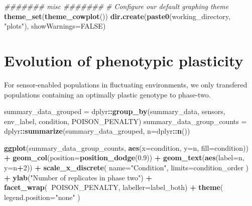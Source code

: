\documentclass[]{book}
\newenvironment{Shaded}{\begin{snugshade}}{\end{snugshade}}
\newcommand{\CommentTok}[1]{\textcolor[rgb]{0.56,0.35,0.01}{\textit{#1}}}
\newcommand{\DataTypeTok}[1]{\textcolor[rgb]{0.13,0.29,0.53}{#1}}
\newcommand{\DecValTok}[1]{\textcolor[rgb]{0.00,0.00,0.81}{#1}}
\newcommand{\FloatTok}[1]{\textcolor[rgb]{0.00,0.00,0.81}{#1}}
\newcommand{\KeywordTok}[1]{\textcolor[rgb]{0.13,0.29,0.53}{\textbf{#1}}}
\newcommand{\NormalTok}[1]{#1}
\newcommand{\OperatorTok}[1]{\textcolor[rgb]{0.81,0.36,0.00}{\textbf{#1}}}
\newcommand{\OtherTok}[1]{\textcolor[rgb]{0.56,0.35,0.01}{#1}}
\newcommand{\StringTok}[1]{\textcolor[rgb]{0.31,0.60,0.02}{#1}}
\begin{document}
\begin{Shaded}
\begin{Highlighting}[]
\CommentTok{####### misc #######}
\CommentTok{# Configure our default graphing theme}
\KeywordTok{theme_set}\NormalTok{(}\KeywordTok{theme_cowplot}\NormalTok{())}
\KeywordTok{dir.create}\NormalTok{(}\KeywordTok{paste0}\NormalTok{(working_directory, }\StringTok{"plots"}\NormalTok{), }\DataTypeTok{showWarnings=}\OtherTok{FALSE}\NormalTok{)}
\end{Highlighting}
\end{Shaded}

\hypertarget{evolution-of-phenotypic-plasticity-3}{%
\section{Evolution of phenotypic plasticity}\label{evolution-of-phenotypic-plasticity-3}}

For sensor-enabled populations in fluctuating environments, we only transfered populations containing an optimally plastic genotype to phase-two.

\begin{Shaded}
\begin{Highlighting}[]
\NormalTok{summary_data_grouped =}\StringTok{ }\NormalTok{dplyr}\OperatorTok{::}\KeywordTok{group_by}\NormalTok{(summary_data, sensors, env_label, condition, POISON_PENALTY)}
\NormalTok{summary_data_group_counts =}\StringTok{ }\NormalTok{dplyr}\OperatorTok{::}\KeywordTok{summarize}\NormalTok{(summary_data_grouped, }\DataTypeTok{n=}\NormalTok{dplyr}\OperatorTok{::}\KeywordTok{n}\NormalTok{())}

\KeywordTok{ggplot}\NormalTok{(summary_data_group_counts, }\KeywordTok{aes}\NormalTok{(}\DataTypeTok{x=}\NormalTok{condition, }\DataTypeTok{y=}\NormalTok{n, }\DataTypeTok{fill=}\NormalTok{condition)) }\OperatorTok{+}
\StringTok{  }\KeywordTok{geom_col}\NormalTok{(}\DataTypeTok{position=}\KeywordTok{position_dodge}\NormalTok{(}\FloatTok{0.9}\NormalTok{)) }\OperatorTok{+}
\StringTok{  }\KeywordTok{geom_text}\NormalTok{(}\KeywordTok{aes}\NormalTok{(}\DataTypeTok{label=}\NormalTok{n, }\DataTypeTok{y=}\NormalTok{n}\OperatorTok{+}\DecValTok{2}\NormalTok{)) }\OperatorTok{+}
\StringTok{  }\KeywordTok{scale_x_discrete}\NormalTok{(}
    \DataTypeTok{name=}\StringTok{"Condition"}\NormalTok{,}
    \DataTypeTok{limits=}\NormalTok{condition_order}
\NormalTok{  ) }\OperatorTok{+}
\StringTok{  }\KeywordTok{ylab}\NormalTok{(}\StringTok{"Number of replicates in phase two"}\NormalTok{) }\OperatorTok{+}
\StringTok{  }\KeywordTok{facet_wrap}\NormalTok{(}\OperatorTok{~}\NormalTok{POISON_PENALTY, }\DataTypeTok{labeller=}\NormalTok{label_both) }\OperatorTok{+}
\StringTok{  }\KeywordTok{theme}\NormalTok{(}
    \DataTypeTok{legend.position=}\StringTok{"none"}
\NormalTok{  )}
\end{Highlighting}
\end{Shaded}
\end{document}
